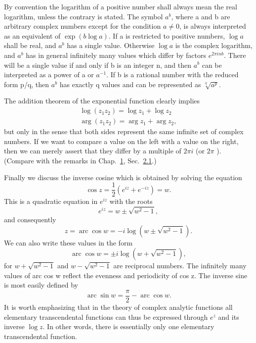 By convention the logarithm of a positive number shall always mean the real logarithm, unless the contrary is stated. The symbol $a^{b}$, where a and b are arbitrary complex numbers except for the condition $a \neq 0$, is always interpreted as an equivalent of $\exp(b \log a)$. If a is restricted to positive numbers, $\log a$ shall be real, and $a^{b}$ has a single value. Otherwise $\log a$ is the complex logarithm, and $a^{b}$ has in general infinitely many values which differ by factors $e^{2\pi in b}$. There will be a single value if and only if b is an integer n, and then $a^{b}$ can be interpreted as a power of a or $a^{-1}$. If b is a rational number with the reduced form p/q, then $a^{b}$ has exactly q values and can be represented as $\sqrt[q]{a^{p}}$.

The addition theorem of the exponential function clearly implies
\begin{equation*}
\begin{array}{l} \log (z _ {1} z _ {2}) = \log z _ {1} + \log z _ {2} \\ \arg (z _ {1} z _ {2}) = \arg z _ {1} + \arg z _ {2}, \end{array}
\end{equation*}
but only in the sense that both sides represent the same infinite set of complex numbers. If we want to compare a value on the left with a value on the right, then we can merely assert that they differ by a multiple of $2\pi i$ (or $2\pi$ ). (Compare with the remarks in Chap.~\hyperref[chap:1]{1}, Sec.~\hyperref[sec:1.2.1]{2.1}.)


Finally we discuss the inverse cosine which is obtained by solving the equation
\begin{equation*}
\cos z = \frac {1}{2} (e ^ {i z} + e ^ {- i z}) = w.
\end{equation*}
This is a quadratic equation in $e^{iz}$ with the roots
\begin{equation*}
e ^ {i z} = w \pm \sqrt {w ^ {2} - 1},
\end{equation*}
and consequently
\begin{equation*}
z = \operatorname{arc} \cos w = - i \log (w \pm \sqrt {w ^ {2} - 1}).
\end{equation*}
We can also write these values in the form
\begin{equation*}
\operatorname{arc} \cos w = \pm i \log (w + \sqrt {w ^ {2} - 1}),
\end{equation*}
for $w + \sqrt{w^{2} - 1}$ and $w - \sqrt{w^{2} - 1}$ are reciprocal numbers. The infinitely many values of arc cos w reflect the evenness and periodicity of cos z. The inverse sine is most easily defined by
\begin{equation*}
\operatorname{arc} \sin w = \frac {\pi}{2} - \operatorname{arc} \cos w.
\end{equation*}
It is worth emphasizing that in the theory of complex analytic functions all elementary transcendental functions can thus be expressed through $e^{z}$ and its inverse $\log z$. In other words, there is essentially only one elementary transcendental function.

